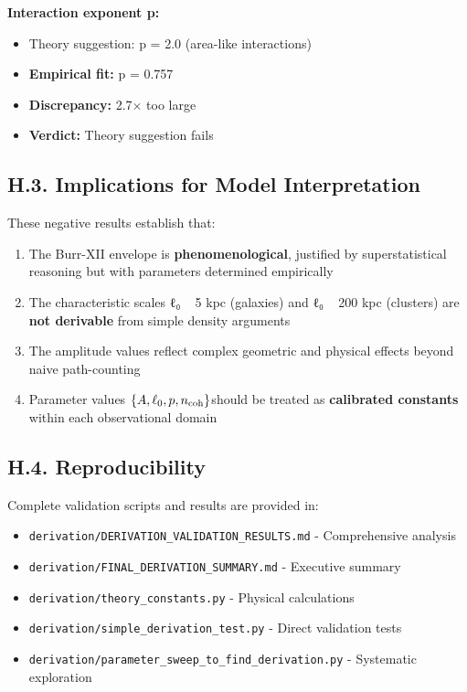 \documentclass[11pt,a4paper]{article}
\begin{document}
\textbf{Interaction exponent p:}

\begin{itemize}
\item Theory suggestion: p = 2.0 (area-like interactions)
\item \textbf{Empirical fit:} p = 0.757
\item \textbf{Discrepancy:} 2.7× too large
\item \textbf{Verdict:} Theory suggestion fails
\end{itemize}


\subsection{H.3. Implications for Model Interpretation}


These negative results establish that:


\begin{enumerate}
\item The Burr-XII envelope is \textbf{phenomenological}, justified by superstatistical reasoning but with parameters determined empirically
\item The characteristic scales ℓ₀ ~ 5 kpc (galaxies) and ℓ₀ ~ 200 kpc (clusters) are \textbf{not derivable} from simple density arguments
\item The amplitude values reflect complex geometric and physical effects beyond naive path-counting
\item Parameter values $\allowbreak \{A, \ell_0, p, n_{\rm coh}\}$\allowbreak  should be treated as \textbf{calibrated constants} within each observational domain
\end{enumerate}


\subsection{H.4. Reproducibility}


Complete validation scripts and results are provided in:

\begin{itemize}
\item \texttt{derivation/DERIVATION\_VALIDATION\_RESULTS.md} - Comprehensive analysis
\item \texttt{derivation/FINAL\_DERIVATION\_SUMMARY.md} - Executive summary
\item \texttt{derivation/theory\_constants.py} - Physical calculations
\item \texttt{derivation/simple\_derivation\_test.py} - Direct validation tests
\item \texttt{derivation/parameter\_sweep\_to\_find\_derivation.py} - Systematic exploration
\end{itemize}
\end{document}

